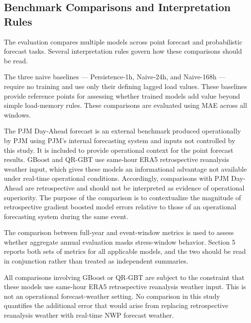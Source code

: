 \documentclass[12pt,a4paper]{article}
\begin{document}
\subsection{Benchmark Comparisons and Interpretation Rules}
The evaluation compares multiple models across point forecast and probabilistic forecast tasks. Several interpretation rules govern how these comparisons should be read.

\begin{description}[leftmargin=!, labelwidth=3.6cm, itemsep=4pt]
\item[Naive baselines] The three naive baselines --- Persistence-1h, Naive-24h, and Naive-168h --- require no training and use only their defining lagged load values. These baselines provide reference points for assessing whether trained models add value beyond simple load-memory rules. These comparisons are evaluated using MAE across all windows.
\item[PJM Day-Ahead] The PJM Day-Ahead forecast is an external benchmark produced operationally by PJM using PJM's internal forecasting system and inputs not controlled by this study. It is included to provide operational context for the point forecast results. GBoost and QR-GBT use same-hour ERA5 retrospective reanalysis weather input, which gives these models an informational advantage not available under real-time operational conditions. Accordingly, comparisons with PJM Day-Ahead are retrospective and should not be interpreted as evidence of operational superiority. The purpose of the comparison is to contextualize the magnitude of retrospective gradient boosted model errors relative to those of an operational forecasting system during the same event.
\item[Full-year vs. event-window] The comparison between full-year and event-window metrics is used to assess whether aggregate annual evaluation masks stress-window behavior. Section 5 reports both sets of metrics for all applicable models, and the two should be read in conjunction rather than treated as independent summaries.
\item[Retrospective weather] All comparisons involving GBoost or QR-GBT are subject to the constraint that these models use same-hour ERA5 retrospective reanalysis weather input. This is not an operational forecast-weather setting. No comparison in this study quantifies the additional error that would arise from replacing retrospective reanalysis weather with real-time NWP forecast weather.
\end{description}
\end{document}
